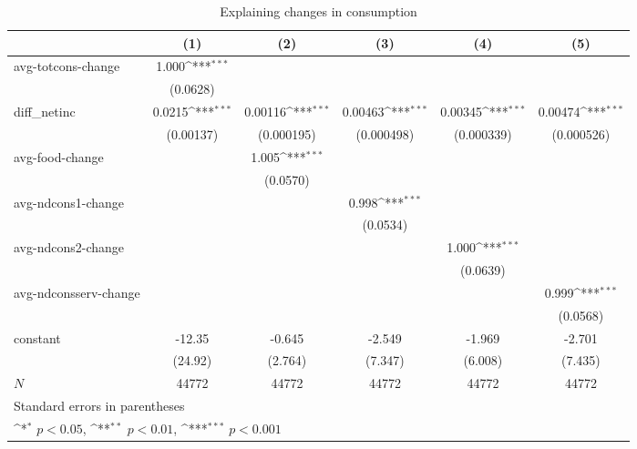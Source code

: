 \begin{table}[!h]\centering
\def\sym#1{\ifmmode^{#1}\else\(^{#1}\)\fi}
\caption{\label{tab:2.1A-deltacons} Explaining changes in consumption}
\begin{tabular}{l*{5}{c}}
\hline\hline
            &\multicolumn{1}{c}{(1)}         &\multicolumn{1}{c}{(2)}         &\multicolumn{1}{c}{(3)}         &\multicolumn{1}{c}{(4)}         &\multicolumn{1}{c}{(5)}         \\
\hline
avg-totcons-change&       1.000\sym{***}&                     &                     &                     &                     \\
            &    (0.0628)         &                     &                     &                     &                     \\
diff\_netinc &      0.0215\sym{***}&     0.00116\sym{***}&     0.00463\sym{***}&     0.00345\sym{***}&     0.00474\sym{***}\\
            &   (0.00137)         &  (0.000195)         &  (0.000498)         &  (0.000339)         &  (0.000526)         \\
avg-food-change&                     &       1.005\sym{***}&                     &                     &                     \\
            &                     &    (0.0570)         &                     &                     &                     \\
avg-ndcons1-change&                     &                     &       0.998\sym{***}&                     &                     \\
            &                     &                     &    (0.0534)         &                     &                     \\
avg-ndcons2-change&                     &                     &                     &       1.000\sym{***}&                     \\
            &                     &                     &                     &    (0.0639)         &                     \\
avg-ndconsserv-change&                     &                     &                     &                     &       0.999\sym{***}\\
            &                     &                     &                     &                     &    (0.0568)         \\
constant    &      -12.35         &      -0.645         &      -2.549         &      -1.969         &      -2.701         \\
            &     (24.92)         &     (2.764)         &     (7.347)         &     (6.008)         &     (7.435)         \\
\hline
\(N\)       &       44772         &       44772         &       44772         &       44772         &       44772         \\
\hline\hline
\multicolumn{6}{l}{\footnotesize Standard errors in parentheses}\\
\multicolumn{6}{l}{\footnotesize \sym{*} \(p<0.05\), \sym{**} \(p<0.01\), \sym{***} \(p<0.001\)}\\
\end{tabular}
\end{table}
